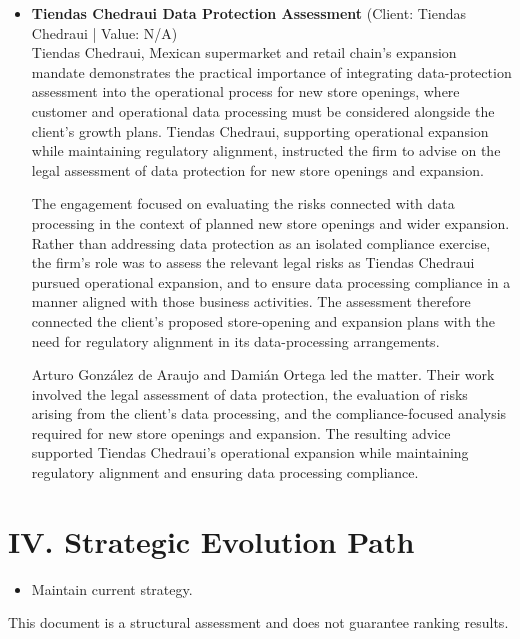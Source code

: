 \documentclass[11pt]{article}
\begin{document}
\begin{itemize}
Arturo González de Araujo, Ernesto Zavala and Damián Ortega led the matter. Their involvement encompassed the advice on the data protection framework, the identification and mitigation of data processing risks, and the integration of data protection into Grupo Modelquipo’s corporate governance strategy. The engagement demonstrates a governance-centred application of data protection advice: one directed toward improving compliance while embedding data protection into governance culture.
\item \textbf{Tiendas Chedraui Data Protection Assessment} (Client: Tiendas Chedraui | Value: N/A)\\ Tiendas Chedraui, Mexican supermarket and retail chain's expansion mandate demonstrates the practical importance of integrating data-protection assessment into the operational process for new store openings, where customer and operational data processing must be considered alongside the client’s growth plans. Tiendas Chedraui, supporting operational expansion while maintaining regulatory alignment, instructed the firm to advise on the legal assessment of data protection for new store openings and expansion.

The engagement focused on evaluating the risks connected with data processing in the context of planned new store openings and wider expansion. Rather than addressing data protection as an isolated compliance exercise, the firm’s role was to assess the relevant legal risks as Tiendas Chedraui pursued operational expansion, and to ensure data processing compliance in a manner aligned with those business activities. The assessment therefore connected the client’s proposed store-opening and expansion plans with the need for regulatory alignment in its data-processing arrangements.

Arturo González de Araujo and Damián Ortega led the matter. Their work involved the legal assessment of data protection, the evaluation of risks arising from the client’s data processing, and the compliance-focused analysis required for new store openings and expansion. The resulting advice supported Tiendas Chedraui’s operational expansion while maintaining regulatory alignment and ensuring data processing compliance.

\end{itemize}

\section*{IV. Strategic Evolution Path}
\begin{itemize}
\item Maintain current strategy.
\end{itemize}

\vfill
\centering
\small{This document is a structural assessment and does not guarantee ranking results.}
\end{document}
